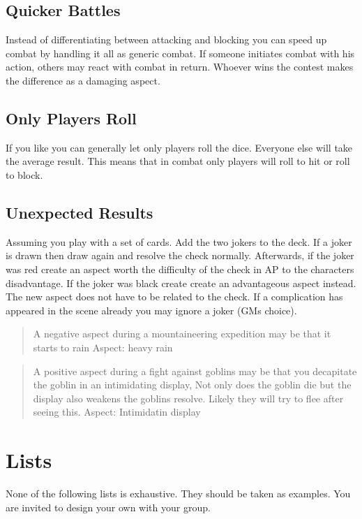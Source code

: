 \documentclass[11pt]{article}
\begin{document}
{\subsection{Quicker Battles}
\label{sec:org37ee4c0}

Instead of differentiating between attacking and blocking you can speed up combat by handling it all as generic combat. If someone initiates combat with his action, others may react with combat in return. Whoever wins the contest makes the difference as a damaging aspect.

\subsection{Only Players Roll}
\label{sec:orga4375c7}
If you like you can generally let only players roll the dice. Everyone else will take the average result. This means that in combat only players will roll to hit or roll to block.

\subsection{Unexpected Results}
\label{sec:orga739436}
Assuming you play with a set of cards. Add the two jokers to the deck. If a joker is drawn then draw again and resolve the check normally. Afterwards, if the joker was red create an aspect worth the difficulty of the check in AP to the characters disadvantage. If the joker was black create create an advantageous aspect instead. The new aspect does not have to be related to the check.
If a complication has appeared in the scene already you may ignore a joker (GMs choice).

\begin{quote}
A negative aspect during a mountaineering expedition may be that it starts to rain
Aspect: heavy rain
\end{quote}

\begin{quote}
A positive aspect during a fight against goblins may be that you decapitate the goblin in an intimidating display, Not only does the goblin die but the display also weakens the goblins resolve. Likely they will try to flee after seeing this.
Aspect: Intimidatin display
\end{quote}

\section{Lists}
\label{sec:org940bdc2}
None of the following lists is exhaustive. They should be taken as examples. You are invited to design your own with your group.

}
\end{document}
